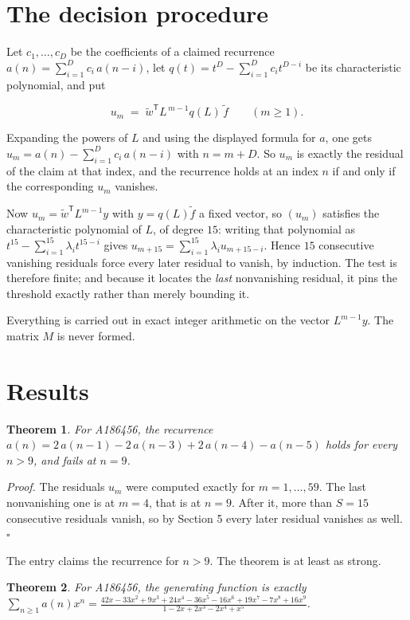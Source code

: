\documentclass[11pt]{article}
\newtheorem{theorem}{Theorem}
\theoremstyle{definition}
\begin{document}
\section{The decision procedure}

Let $c_1,\dots,c_D$ be the coefficients of a claimed recurrence $a(n) = \sum_{i=1}^{D} c_i\,a(n-i)$, let $q(t) = t^{D} - \sum_{i=1}^{D} c_i t^{D-i}$ be its characteristic polynomial, and put

\[u_m \;=\; \tilde w^{\mathsf T} L^{\,m-1} q(L)\,\tilde f \qquad (m \ge 1).\]

Expanding the powers of $L$ and using the displayed formula for $a$, one gets $u_m = a(n) - \sum_{i=1}^{D} c_i\,a(n-i)$ with $n = m + D$. So $u_m$ is exactly the residual of the claim at that index, and the recurrence holds at an index $n$ if and only if the corresponding $u_m$ vanishes.

Now $u_m = \tilde w^{\mathsf T} L^{m-1} y$ with $y = q(L)\tilde f$ a fixed vector, so $(u_m)$ satisfies the characteristic polynomial of $L$, of degree $15$: writing that polynomial as $t^{15} - \sum_{i=1}^{15} \lambda_i t^{15-i}$ gives $u_{m+15} = \sum_{i=1}^{15} \lambda_i u_{m+15-i}$. Hence $15$ consecutive vanishing residuals force every later residual to vanish, by induction. The test is therefore finite; and because it locates the {\itshape last} nonvanishing residual, it pins the threshold exactly rather than merely bounding it.

Everything is carried out in exact integer arithmetic on the vector $L^{m-1}y$. The matrix $M$ is never formed.

\section{Results}

\begin{theorem} For A186456, the recurrence $a(n) = 2\,a(n-1) - 2\,a(n-3) + 2\,a(n-4) - a(n-5)$ holds for every $n > 9$, and fails at $n = 9$.\end{theorem}

{\itshape Proof.} The residuals $u_m$ were computed exactly for $m = 1,\dots,59$. The last nonvanishing one is at $m = 4$, that is at $n = 9$. After it, more than $S = 15$ consecutive residuals vanish, so by Section 5 every later residual vanishes as well. $\square$

The entry claims the recurrence for $n > 9$. The theorem is at least as strong.

\begin{theorem} For A186456, the generating function is exactly $\sum_{n\ge 1} a(n)x^n = \frac{42x - 33x^{2} + 9x^{3} + 24x^{4} - 36x^{5} - 16x^{6} + 19x^{7} - 7x^{8} + 16x^{9}}{1 - 2x + 2x^{3} - 2x^{4} + x^{5}}$.\end{theorem}
\end{document}
